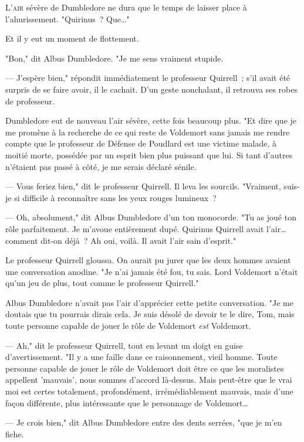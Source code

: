 
\lettrine{L}{'air} sévère de Dumbledore ne dura que le temps de laisser place à l'ahurissement. "Quirinus~? Que…"

Et il y eut un moment de flottement.

"Bon," dit Albus Dumbledore. "Je me sens vraiment stupide.

--- J'espère bien," répondit immédiatement le professeur Quirrell~; s'il avait été surpris de se faire avoir, il le cachait. D'un geste nonchalant, il retrouva ses robes de professeur.

Dumbledore eut de nouveau l'air sévère, cette fois beaucoup plus. "Et dire que je me promène à la recherche de ce qui reste de Voldemort sans jamais me rendre compte que le professeur de Défense de Poudlard est une victime malade, à moitié morte, possédée par un esprit bien plus puissant que lui. Si tant d'autres n'étaient pas passé à côté, je me serais déclaré sénile.

--- Vous feriez bien," dit le professeur Quirrell. Il leva les sourcils. "Vraiment, suis-je si difficile à reconnaître sans les yeux rouges lumineux~?

--- Oh, absolument," dit Albus Dumbledore d'un ton monocorde. "Tu as joué ton rôle parfaitement. Je m'avoue entièrement dupé. Quirinus Quirrell avait l'air… comment dit-on déjà~? Ah oui, voilà. Il avait l'air sain d'esprit."

Le professeur Quirrell gloussa. On aurait pu jurer que les deux hommes avaient une conversation anodine. "Je n'ai jamais été fou, tu sais. Lord Voldemort n'était qu'un jeu de plus, tout comme le professeur Quirrell."

Albus Dumbledore n'avait pas l'air d'apprécier cette petite conversation. "Je me doutais que tu pourrais dirais cela. Je suis désolé de devoir te le dire, Tom, mais toute personne capable de jouer le rôle de Voldemort \emph{est} Voldemort.

--- Ah," dit le professeur Quirrell, tout en levant un doigt en guise d'avertissement. "Il y a une faille dans ce raisonnement, vieil homme. Toute personne capable de jouer le rôle de Voldemort doit être ce que les moralistes appellent 'mauvais', nous sommes d'accord là-dessus. Mais peut-être que le vrai moi est certes totalement, profondément, irrémédiablement mauvais, mais d'une façon différente, plus intéressante que le personnage de Voldemort…

--- Je crois bien," dit Albus Dumbledore entre des dents serrées, "que je m'en fiche.

